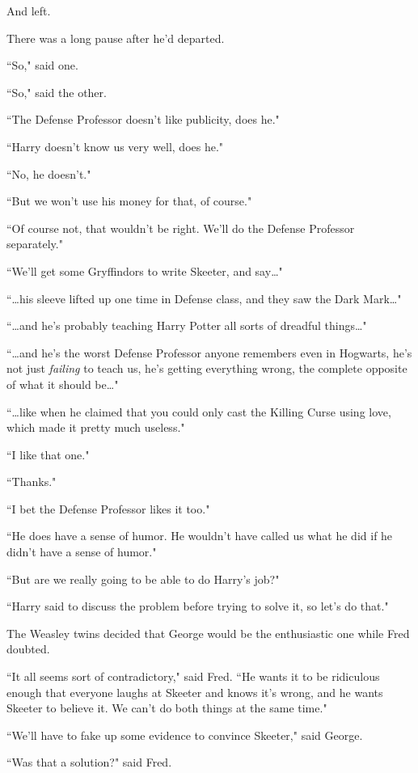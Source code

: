 And left.

There was a long pause after he'd departed.

``So," said one.

``So," said the other.

``The Defense Professor doesn't like publicity, does he."

``Harry doesn't know us very well, does he."

``No, he doesn't."

``But we won't use his money for that, of course."

``Of course not, that wouldn't be right. We'll do the Defense Professor separately."

``We'll get some Gryffindors to write Skeeter, and say{\ldots}"

``{\ldots}his sleeve lifted up one time in Defense class, and they saw the Dark Mark{\ldots}"

``{\ldots}and he's probably teaching Harry Potter all sorts of dreadful things{\ldots}"

``{\ldots}and he's the worst Defense Professor anyone remembers even in Hogwarts, he's not just \emph{failing} to teach us, he's getting everything wrong, the complete opposite of what it should be{\ldots}"

``{\ldots}like when he claimed that you could only cast the Killing Curse using love, which made it pretty much useless."

``I like that one."

``Thanks."

``I bet the Defense Professor likes it too."

``He does have a sense of humor. He wouldn't have called us what he did if he didn't have a sense of humor."

``But are we really going to be able to do Harry's job?"

``Harry said to discuss the problem before trying to solve it, so let's do that."

The Weasley twins decided that George would be the enthusiastic one while Fred doubted.

``It all seems sort of contradictory," said Fred. ``He wants it to be ridiculous enough that everyone laughs at Skeeter and knows it's wrong, and he wants Skeeter to believe it. We can't do both things at the same time."

``We'll have to fake up some evidence to convince Skeeter," said George.

``Was that a solution?" said Fred.

